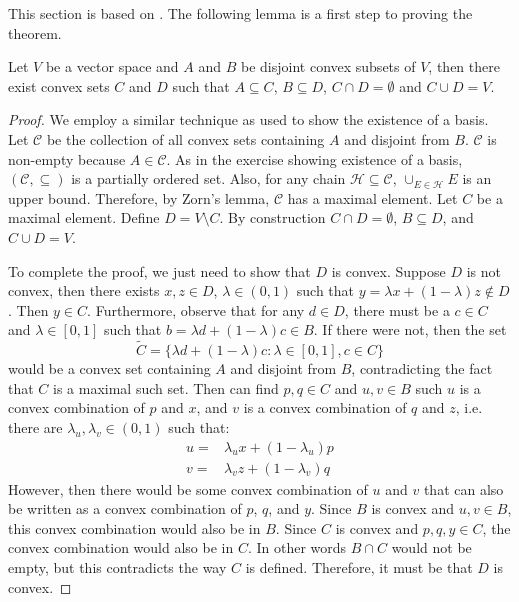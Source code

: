 This section is based on \cite{holmes1975}.  The following lemma is a
first step to proving the theorem.
\begin{lemma}[Stone]\label{lem:stone}
  Let $V$ be a vector space and $A$ and $B$ be disjoint convex subsets
  of $V$, then there exist convex sets $C$ and $D$ such that $A
  \subseteq C$, $B \subseteq D$, $C \cap D = \emptyset$ and $C \cup D
  = V$.
\end{lemma}
\begin{proof}
  We employ a similar technique as used to show the existence of a
  basis. Let $\mathcal{C}$ be the collection of all convex sets
  containing $A$ and disjoint from $B$. $\mathcal{C}$ is non-empty
  because $A \in \mathcal{C}$.  As in the exercise showing existence
  of a basis, $(\mathcal{C}, \subseteq)$ is a partially ordered
  set. Also, for any chain $\mathcal{H} \subseteq \mathcal{C}$,
  $\cup_{E \in \mathcal{H}} E$ is an upper bound. Therefore, by Zorn's
  lemma, $\mathcal{C}$ has a maximal element. Let $C$ be a maximal
  element. Define $D = V \setminus C$.  By construction
  $C \cap D = \emptyset$, $B \subseteq D$, and $C \cup D = V$.

  To complete the proof, we just need to show that $D$ is
  convex. Suppose $D$ is not convex, then there exists $x,z \in D$,
  $\lambda \in (0,1)$ such that $y = \lambda x + (1-\lambda) z \not\in
  D$. Then $y \in C$. Furthermore, observe that for any $d \in D$, there
  must be a $c \in C$ and $\lambda \in [0,1]$ such that $b = \lambda d
  + (1-\lambda) c \in B$. If there were not, then the set 
  \[ \tilde{C} = \{\lambda d + (1-\lambda) c:  \lambda \in [0,1], c
  \in C\} \]
  would be a convex set containing $A$ and disjoint from $B$,
  contradicting the fact that $C$ is a maximal such set. 
  Then can find $p,q \in C$ and $u,v \in B$ such $u$ is a convex
  combination of $p$ and $x$, and $v$ is a convex combination of $q$
  and $z$, i.e. there are $\lambda_u, \lambda_v \in (0,1)$ such that:
  \begin{align*}
    u = & \lambda_u x + (1-\lambda_u) p \\
    v = & \lambda_v z + (1-\lambda_v) q 
  \end{align*}
  However, then there would be some convex combination of $u$ and $v$
  that can also be written as a convex combination of $p$, $q$, and
  $y$. Since $B$ is convex and $u,v\in B$, this convex combination
  would also be in $B$. Since $C$ is convex and $p,q,y \in C$, the
  convex combination would also be in $C$. In other words $B \cap C$
  would not be empty, but this contradicts the way $C$ is
  defined. Therefore, it must be that $D$ is convex. 
\end{proof}
